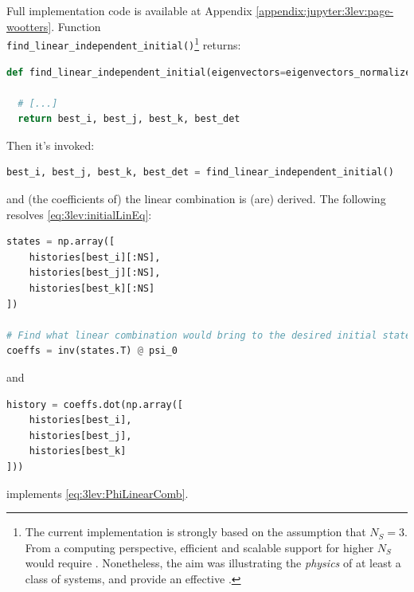 Full implementation code is available at Appendix
\ref{appendix:jupyter:3lev:page-wootters}.
Function \\
\Verb#find_linear_independent_initial()#\footnote{
  The current implementation is strongly based on the assumption that $N_S = 3$.
  From a computing perspective,
  efficient and scalable support for higher $N_S$
  would require  \parencite{comp:refactor}.
  Nonetheless,
  the aim was illustrating the \emph{physics} of at least a class of systems, and
  provide an effective  \parencite{comp:poc}.
}
returns:
\begin{lstlisting}[language=Python]
def find_linear_independent_initial(eigenvectors=eigenvectors_normalized_in_S):

  # [...]
  return best_i, best_j, best_k, best_det
\end{lstlisting}
Then it's invoked:
\begin{lstlisting}[language=Python]
best_i, best_j, best_k, best_det = find_linear_independent_initial()
\end{lstlisting}
and (the coefficients of) the linear combination is (are) derived.
The following resolves \eqref{eq:3lev:initialLinEq}:
\begin{lstlisting}[language=Python]
states = np.array([
    histories[best_i][:NS],
    histories[best_j][:NS],
    histories[best_k][:NS]
])

# Find what linear combination would bring to the desired initial state psi_0_n
coeffs = inv(states.T) @ psi_0
\end{lstlisting}
and
\begin{lstlisting}[language=Python]
history = coeffs.dot(np.array([
    histories[best_i],
    histories[best_j],
    histories[best_k]
]))
\end{lstlisting}
implements \eqref{eq:3lev:PhiLinearComb}.


















